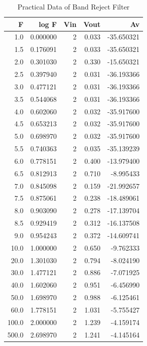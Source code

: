 \documentclass[12pt]{article}
\begin{document}
\begin{table}[h!]
    \centering
    \caption{Practical Data of Band Reject Filter}
    \begin{tabular}{rrrrr}
        \hline
        F &    log F &  Vin &  Vout &         Av \\
        \hline
        1.0 & 0.000000 &    2 & 0.033 & -35.650321 \\
        1.5 & 0.176091 &    2 & 0.033 & -35.650321 \\
        2.0 & 0.301030 &    2 & 0.330 & -15.650321 \\
        2.5 & 0.397940 &    2 & 0.031 & -36.193366 \\
        3.0 & 0.477121 &    2 & 0.031 & -36.193366 \\
        3.5 & 0.544068 &    2 & 0.031 & -36.193366 \\
        4.0 & 0.602060 &    2 & 0.032 & -35.917600 \\
        4.5 & 0.653213 &    2 & 0.032 & -35.917600 \\
        5.0 & 0.698970 &    2 & 0.032 & -35.917600 \\
        5.5 & 0.740363 &    2 & 0.035 & -35.139239 \\
        6.0 & 0.778151 &    2 & 0.400 & -13.979400 \\
        6.5 & 0.812913 &    2 & 0.710 &  -8.995433 \\
        7.0 & 0.845098 &    2 & 0.159 & -21.992657 \\
        7.5 & 0.875061 &    2 & 0.238 & -18.489061 \\
        8.0 & 0.903090 &    2 & 0.278 & -17.139704 \\
        8.5 & 0.929419 &    2 & 0.312 & -16.137508 \\
        9.0 & 0.954243 &    2 & 0.372 & -14.609741 \\
        10.0 & 1.000000 &    2 & 0.650 &  -9.762333 \\
        20.0 & 1.301030 &    2 & 0.794 &  -8.024190 \\
        30.0 & 1.477121 &    2 & 0.886 &  -7.071925 \\
        40.0 & 1.602060 &    2 & 0.951 &  -6.456990 \\
        50.0 & 1.698970 &    2 & 0.988 &  -6.125461 \\
        60.0 & 1.778151 &    2 & 1.031 &  -5.755427 \\
        100.0 & 2.000000 &    2 & 1.239 &  -4.159174 \\
        500.0 & 2.698970 &    2 & 1.241 &  -4.145164 \\

\end{tabular}
\end{table}
\end{document}
